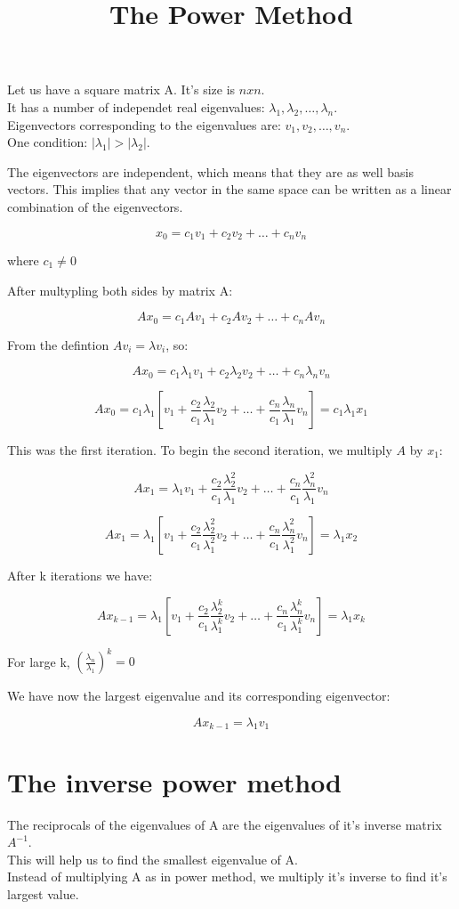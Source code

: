 \documentclass{article}
\title{The Power Method}
\begin{document}
  \maketitle
  \newpage

Let us have a square matrix A. It's size is $nxn$. \\
It has a number of independet real eigenvalues: $\lambda_1, \lambda_2, \dots, \lambda_n$. \\
Eigenvectors corresponding to the eigenvalues are: $v_1, v_2, \dots, v_n$. \\
One condition: $|\lambda_1| > |\lambda_2|$.

The eigenvectors are independent, which means that they are as well basis vectors. This implies that any vector in the same space can be written as a linear combination of the eigenvectors.

$$x_0 = c_1v_1+c_2v_2+\dots+c_nv_n$$

where $c_1\ne0$

After multypling both sides by matrix A:

$$Ax_0 = c_1Av_1+c_2Av_2+\dots+c_nAv_n$$

From the defintion $Av_i = \lambda{v_i}$, so:

$$Ax_0 = c_1\lambda_1v_1+c_2\lambda_2v_2+\dots+c_n\lambda_nv_n$$

$$Ax_0 = c_1\lambda_1[v_1+\frac{c_2}{c_1}\frac{\lambda_2}{\lambda_1}v_2+\dots+\frac{c_n}{c_1}\frac{\lambda_n}{\lambda_1}v_n]= c_1\lambda_1x_1$$

This was the first iteration. To begin the second iteration, we multiply $A$ by $x_1$:

$$Ax_1 = \lambda_1{v_1}+\frac{c_2}{c_1}\frac{\lambda_2^2}{\lambda_1}v_2+\dots+\frac{c_n}{c_1}\frac{\lambda_n^2}{\lambda_1}v_n$$

$$Ax_1 = \lambda_1[v_1+\frac{c_2}{c_1}\frac{\lambda_2^2}{\lambda_1^2}v_2+\dots+\frac{c_n}{c_1}\frac{\lambda_n^2}{\lambda_1^2}v_n] = \lambda_1x_2$$

After k iterations we have:

$$Ax_{k-1} = \lambda_1[v_1+\frac{c_2}{c_1}\frac{\lambda_2^k}{\lambda_1^k}v_2+\dots+\frac{c_n}{c_1}\frac{\lambda_n^k}{\lambda_1^k}v_n] = \lambda_1x_k$$


For large k, $(\frac{\lambda_n}{\lambda_1})^{k} = 0$

We have now the largest eigenvalue and its corresponding eigenvector:

$$Ax_{k-1} = {\lambda_1}v_1$$

\newpage

\section*{The inverse power method}
The reciprocals of the eigenvalues of A are the eigenvalues of it's inverse matrix  $A^{-1}$. \\
This will help us to find the smallest eigenvalue of A. \\
Instead of multiplying A as in power method, we multiply it's inverse to find it's largest value.
\end{document}
